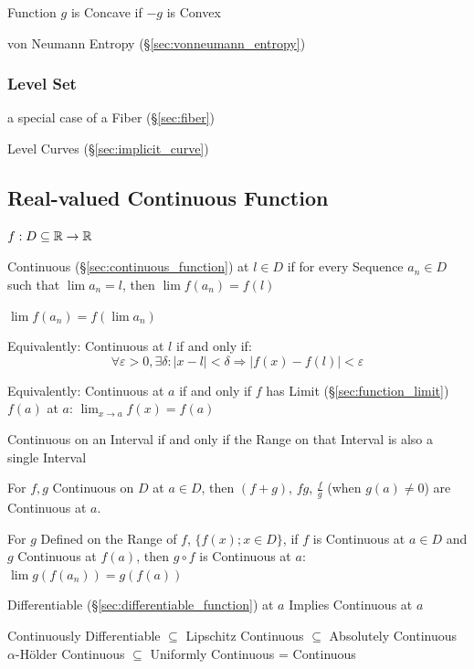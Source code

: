 Function $g$ is Concave if $-g$ is Convex

\fist von Neumann Entropy (\S\ref{sec:vonneumann_entropy})



\subsubsection{Level Set}\label{sec:level_set}

a special case of a Fiber (\S\ref{sec:fiber})

Level Curves (\S\ref{sec:implicit_curve})



\subsection{Real-valued Continuous Function}\label{sec:real_continuous}

$f : D \subseteq \mathbb{R} \rightarrow \mathbb{R}$

Continuous (\S\ref{sec:continuous_function}) at $l \in D$ if for every Sequence
$a_n \in D$ such that $\lim a_n = l$, then $\lim f(a_n) = f(l)$

$\lim f (a_n) = f (\lim a_n)$

Equivalently: Continuous at $l$ if and only if:
\[
  \forall \varepsilon > 0, \exists \delta :
  |x - l| < \delta \Rightarrow |f(x) - f(l)| < \varepsilon
\]

Equivalently: Continuous at $a$ if and only if $f$ has Limit
(\S\ref{sec:function_limit}) $f(a)$ at $a$: $\lim_{x \rightarrow
  a}f(x) = f(a)$

Continuous on an Interval if and only if the Range on that Interval is
also a single Interval

For $f,g$ Continuous on $D$ at $a \in D$, then $(f + g)$, $f g$,
$\frac{f}{g}$ (when $g(a) \neq 0$) are Continuous at $a$.

For $g$ Defined on the Range of $f$, $\{ f(x); x \in D\}$, if $f$ is
Continuous at $a \in D$ and $g$ Continuous at $f(a)$, then $g \circ f$
is Continuous at $a$: $\lim g(f(a_n)) = g(f(a))$

Differentiable (\S\ref{sec:differentiable_function}) at $a$ Implies
Continuous at $a$

Continuously Differentiable $\subseteq$ Lipschitz Continuous $\subseteq$
Absolutely Continuous $\alpha$-H\"older Continuous $\subseteq$ Uniformly
Continuous = Continuous

